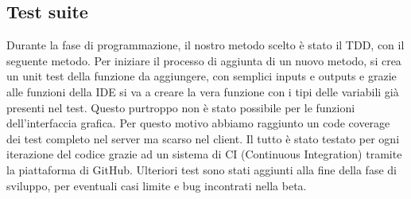 \documentclass[12pt, a4paper]{report}
\begin{document}
\subsection{Test suite}

Durante la fase di programmazione, il nostro metodo scelto è stato il TDD, con
il seguente metodo. Per iniziare il processo di aggiunta di un nuovo metodo, si
crea un unit test della funzione da aggiungere, con semplici inputs e outputs e
grazie alle funzioni della IDE si va a creare la vera funzione con i tipi delle
variabili già presenti nel test. Questo purtroppo non è stato possibile per le
funzioni dell'interfaccia grafica. Per questo motivo abbiamo raggiunto un code
coverage dei test completo nel server ma scarso nel client. Il tutto è stato
testato per ogni iterazione del codice grazie ad un sistema di CI (Continuous
Integration) tramite la piattaforma di GitHub. Ulteriori test sono stati
aggiunti alla fine della fase di sviluppo, per eventuali casi limite e bug
incontrati nella beta.



\end{document}
